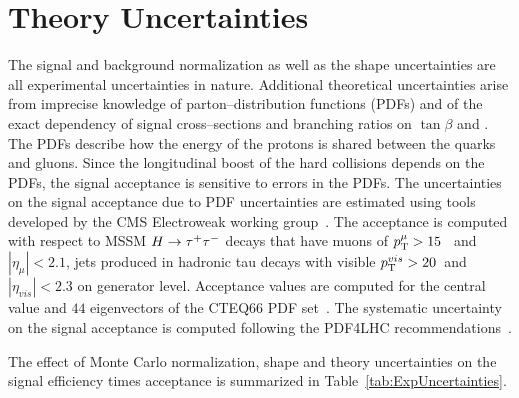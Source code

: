 \section{Theory Uncertainties}
%
The signal and background normalization as well as the shape uncertainties are
all experimental uncertainties in nature.  Additional theoretical uncertainties
arise from imprecise knowledge of parton--distribution functions (PDFs) and of
the exact dependency of signal cross--sections and branching ratios on
$\tan\beta$ and \ma.  The PDFs describe how the energy of the protons is shared
between the quarks and gluons.  Since the longitudinal boost of the hard
collisions depends on the PDFs, the signal acceptance is sensitive to errors in
the PDFs.  The uncertainties on the signal acceptance due to PDF uncertainties
are estimated using tools developed by the CMS Electroweak working
group~\cite{CMS_EWK_pdfUncertaintyTools}.  The acceptance is computed with
respect to MSSM $H \to \tau^+\tau^-$ decays that have muons of $p_{\mathrm{T}}^{\mu} > 15$~\GeVc
and $\left| \eta_{\mu} \right| < 2.1$, jets produced in hadronic tau decays with
visible $p_{\mathrm{T}}^{vis} > 20$~\GeVc and $\left| \eta_{vis} \right| < 2.3$ on
generator level.  Acceptance values are computed for the central value and $44$
eigenvectors of the CTEQ66 PDF set~\cite{CTEQpdfSet}.  The systematic
uncertainty on the signal acceptance is computed following the PDF4LHC
recommendations~\cite{pdfAccSys01,pdfAccSys02}.

The effect of Monte Carlo normalization, shape and theory uncertainties on the
signal efficiency times acceptance is summarized in
Table~\ref{tab:ExpUncertainties}.

